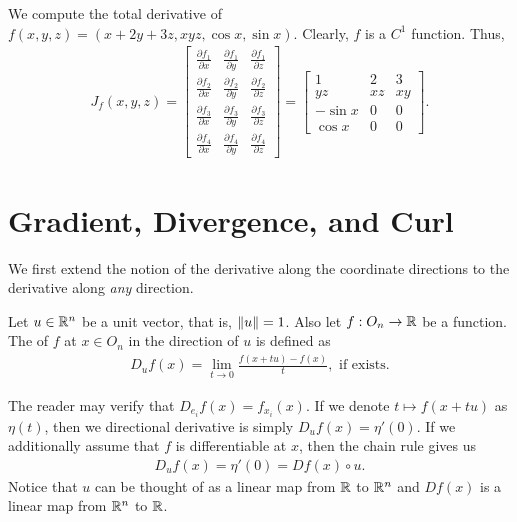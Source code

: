 \begin{example}
    We compute the total derivative of $f(x,y,z) = (x+2y+3z,xyz,\cos x, \sin x)$. Clearly, $f$ is a $C^{1}$ function. Thus,
    \begin{align}
        J_{f}(x,y,z) = \begin{bmatrix}
            \frac{\partial f_{1}}{\partial x} & \frac{\partial f_{1}}{\partial y} & \frac{\partial f_{1}}{\partial z} \\
            \frac{\partial f_{2}}{\partial x} & \frac{\partial f_{2}}{\partial y} & \frac{\partial f_{2}}{\partial z} \\
            \frac{\partial f_{3}}{\partial x} & \frac{\partial f_{3}}{\partial y} & \frac{\partial f_{3}}{\partial z} \\
            \frac{\partial f_{4}}{\partial x} & \frac{\partial f_{4}}{\partial y} & \frac{\partial f_{4}}{\partial z}
        \end{bmatrix} = \begin{bmatrix}
            1 & 2 & 3 \\
            yz & xz & xy \\
            -\sin x & 0 & 0 \\
            \cos x & 0 & 0
        \end{bmatrix}.
    \end{align}
\end{example}

\section{Gradient, Divergence, and Curl}

We first extend the notion of the derivative along the coordinate directions to the derivative along \textit{any} direction.

\begin{definition}
    Let $u \in \mathbb{R}^{n}$ be a unit vector, that is, $\left\lVert u\right\rVert = 1$. Also let $f:O_{n} \to \mathbb{R}$ be a function. The  of $f$ at $x \in O_{n}$ in the direction of $u$ is defined as
    \begin{align}
        D_{u}f(x) = \lim_{t \to 0} \frac{f(x+tu)-f(x)}{t}, \text{ if exists.}
    \end{align}
\end{definition}

The reader may verify that $D_{e_{i}}f(x) = f_{x_{i}}(x)$. If we denote $t \mapsto f(x+tu)$ as $\eta(t)$, then we directional derivative is simply $D_{u}f(x) = \eta'(0)$. If we additionally assume that $f$ is differentiable at $x$, then the chain rule gives us
\begin{align}
    D_{u}f(x) = \eta'(0) = Df(x) \circ u.
\end{align}
Notice that $u$ can be thought of as a linear map from $\mathbb{R}$ to $\mathbb{R}^{n}$ and $Df(x)$ is a linear map from $\mathbb{R}^{n}$ to $\mathbb{R}$.


